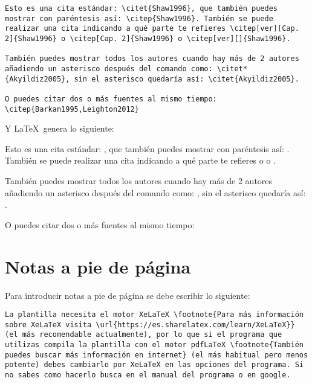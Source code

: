\begin{lstlisting}[style=Latex-color]
Esto es una cita estándar: \citet{Shaw1996}, que también puedes mostrar con paréntesis así: \citep{Shaw1996}. También se puede realizar una cita indicando a qué parte te refieres \citep[ver][Cap. 2]{Shaw1996} o \citep[Cap. 2]{Shaw1996} o \citep[ver][]{Shaw1996}. 

También puedes mostrar todos los autores cuando hay más de 2 autores añadiendo un asterisco después del comando como: \citet*{Akyildiz2005}, sin el asterisco quedaría así: \citet{Akyildiz2005}.

O puedes citar dos o más fuentes al mismo tiempo: \citep{Barkan1995,Leighton2012}

\end{lstlisting}
Y \LaTeX~genera lo siguiente:
\\
\par Esto es una cita estándar: \citet{Shaw1996}, que también puedes mostrar con paréntesis así: \citep{Shaw1996}. También se puede realizar una cita indicando a qué parte te refieres \citep[ver][Cap. 2]{Shaw1996} o \citep[Cap. 2]{Shaw1996} o \citep[ver][]{Shaw1996}. 
\\
\par También puedes mostrar todos los autores cuando hay más de 2 autores añadiendo un asterisco después del comando como: \citet*{Akyildiz2005}, sin el asterisco quedaría así: \citet{Akyildiz2005}.
\\
\par O puedes citar dos o más fuentes al mismo tiempo: \citep{Barkan1995,Leighton2012}


\section{Notas a pie de página}

Para introducir notas a pie de página se debe escribir lo siguiente:

\begin{lstlisting}[style=Latex-color]
	La plantilla necesita el motor XeLaTeX \footnote{Para más información sobre XeLaTeX visita \url{https://es.sharelatex.com/learn/XeLaTeX}} (el más recomendable actualmente), por lo que si el programa que utilizas compila la plantilla con el motor pdfLaTeX \footnote{También puedes buscar más información en internet} (el más habitual pero menos potente) debes cambiarlo por XeLaTeX en las opciones del programa. Si no sabes como hacerlo busca en el manual del programa o en google.
\end{lstlisting}

